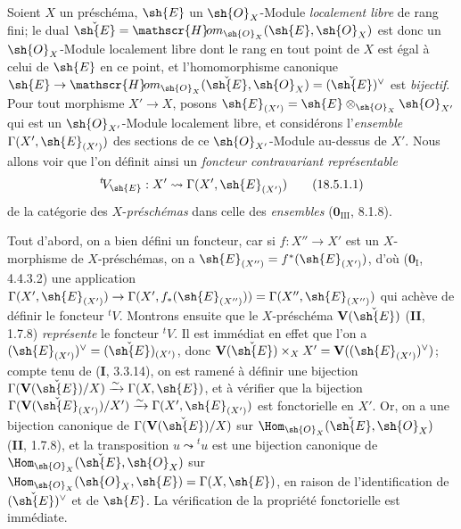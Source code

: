\begingroup
\newcommand{\shHom}{\mathscr{H}\!om}
\begin{env}[18.5.1]
\label{IV.18.5.1}
Soient $X$ un préschéma, $\sh{E}$ un $\sh{O}_X$-Module \emph{localement libre} de rang fini; le dual $\check{\sh{E}}=\shHom_{\sh{O}_X}(\sh{E},\sh{O}_X)$ est donc un $\sh{O}_X$-Module localement libre dont le rang en tout point de $X$ est égal à celui de $\sh{E}$ en ce point, et l'homomorphisme canonique $\sh{E}\to\shHom_{\sh{O}_X}(\check{\sh{E}},\sh{O}_X)=(\check{\sh{E}})^\vee$ est \emph{bijectif}. Pour tout morphisme $X'\to X$, posons $\sh{E}_{(X')}=\sh{E}\otimes_{\sh{O}_X}\sh{O}_{X'}$ qui est un $\sh{O}_{X'}$-Module localement libre, et considérons l'\emph{ensemble} $\Gamma(X',\sh{E}_{(X')})$ des sections de ce $\sh{O}_{X'}$-Module au-dessus de $X'$. Nous allons voir que l'on définit ainsi un \emph{foncteur contravariant représentable}
\begin{equation}
  {}^t\!V_{\sh{E}}:X'\leadsto\Gamma(X',\sh{E}_{(X')})
  \tag{18.5.1.1}\label{IV.18.5.1.1}
\end{equation}
de la catégorie des $X$-\emph{préschémas} dans celle des \emph{ensembles} ($\mathbf{0}_{\mathrm{III}}$, 8.1.8).

Tout d'abord, on a bien défini un foncteur, car si $f:X''\to X'$ est un $X$-morphisme de $X$-préschémas, on a $\sh{E}_{(X'')}=f^*(\sh{E}_{(X')})$, d'où ($\mathbf{0}_{\mathrm I}$, 4.4.3.2) une application $\Gamma(X',\sh{E}_{(X')})\to\Gamma(X',f_*(\sh{E}_{(X'')}))=\Gamma(X'',\sh{E}_{(X'')})$ qui achève de définir le foncteur ${}^t\!V$. Montrons ensuite que le $X$-préschéma $\mathbf V(\check{\sh{E}})$ (\textbf{II}, 1.7.8) \emph{représente} le foncteur ${}^t\!V$. Il est immédiat en effet que l'on a $(\sh{E}_{(X')})^\vee=(\check{\sh{E}})_{(X')}$, donc $\mathbf V(\check{\sh{E}})\times_X X'=\mathbf V((\sh{E}_{(X')})^\vee)$; compte tenu de (\textbf{I}, 3.3.14), on est ramené à définir une bijection $\Gamma(\mathbf V(\check{\sh{E}})/X)\xrightarrow{\sim}\Gamma(X,\sh{E})$, et à vérifier que la bijection $\Gamma(\mathbf V(\check{\sh{E}}_{(X')})/X')\xrightarrow{\sim}\Gamma(X',\sh{E}_{(X')})$ est fonctorielle en $X'$. Or, on a une bijection canonique de $\Gamma(\mathbf V(\check{\sh{E}})/X)$ sur $\Hom_{\sh{O}_X}(\check{\sh{E}},\sh{O}_X)$ (\textbf{II}, 1.7.8), et la transposition $u\leadsto{}^t u$ est une bijection canonique de $\Hom_{\sh{O}_X}(\check{\sh{E}},\sh{O}_X)$ sur $\Hom_{\sh{O}_X}(\sh{O}_X,\sh{E})=\Gamma(X,\sh{E})$, en raison de l'identification de $(\check{\sh{E}})^\vee$ et de $\sh{E}$. La vérification de la propriété fonctorielle est immédiate.
\end{env}
\endgroup

